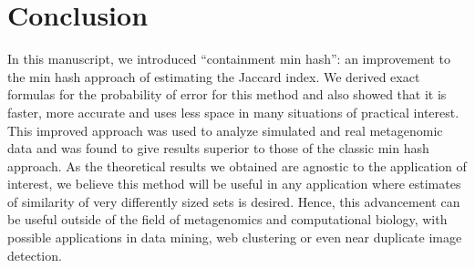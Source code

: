 \documentclass[11pt,reqno]{amsart}
\theoremstyle{remark}
\numberwithin{equation}{section}
\begin{document}
\section{Conclusion}
In this manuscript, we introduced ``containment min hash'': an improvement to the min hash approach of estimating the Jaccard index. We derived exact formulas for the probability of error for this method and also showed that it is faster, more accurate and uses less space in many situations of practical interest. This improved approach was used to analyze simulated and real metagenomic data and was found to give results superior to those of the classic min hash approach. As the theoretical results we obtained are agnostic to the application of interest, we believe this method will be useful in any application where estimates of similarity of very differently sized sets is desired. Hence, this advancement can be useful outside of the field of metagenomics and computational biology, with possible applications in data mining, web clustering or even near duplicate image detection.



{}

\end{document}
